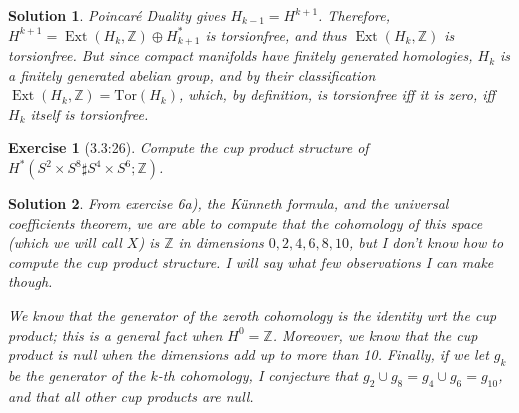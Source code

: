 \documentclass{article}
\theoremstyle{plain}
\newtheorem*{ex}{Exercise}
\theoremstyle{nonumberplain}
\newtheorem{sol}{Solution}
\newcommand{\Z}{\mathbb{Z}}
\DeclareMathOperator{\Ext}{Ext}
\begin{document}
\begin{sol}
Poincaré Duality gives $H_{k-1} = H^{k+1}$. Therefore, $H^{k+1} = \Ext(H_k, \Z) \oplus H_{k+1}^*$ is torsionfree, and thus $\Ext(H_k,\Z)$ is torsionfree. But since compact manifolds have finitely generated homologies, $H_k$ is a finitely generated abelian group, and by their classification $\Ext(H_k,\Z) = \mathrm{Tor}(H_k)$, which, by definition, is torsionfree iff it is zero, iff $H_k$ itself is torsionfree.
\end{sol}

\begin{ex}[3.3:26]
Compute the cup product structure of $H^*(S^2 \times S^8 \sharp S^4 \times S^6;\Z)$.
\end{ex}

\begin{sol}
From exercise 6a), the Künneth formula, and the universal coefficients theorem, we are able to compute that the cohomology of this space (which we will call $X$) is $\Z$ in dimensions $0, 2, 4, 6, 8, 10$, but I don't know how to compute the cup product structure. I will say what few observations I can make though.

We know that the generator of the zeroth cohomology is the identity wrt the cup product; this is a general fact when $H^0 = \Z$. Moreover, we know that the cup product is null when the dimensions add up to more than 10. Finally, if we let $g_k$ be the generator of the $k$-th cohomology, I conjecture that $g_2 \cup g_8 = g_4 \cup g_6 = g_10$, and that all other cup products are null.
\end{sol}
\end{document}
